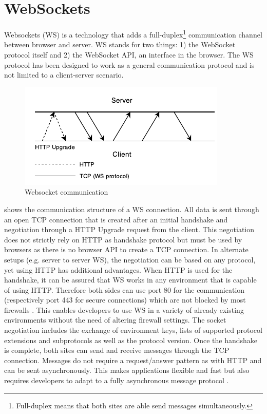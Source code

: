 \section{WebSockets}
\label{realtime-ws}

Websockets (WS) is a technology that adds a full-duplex\footnote{Full-duplex means that both sites are able send messages simultaneously.} communication channel between browser and server. WS stands for two things: 1) the WebSocket protocol itself and 2) the WebSocket API, an interface in the browser. The WS protocol has been designed to work as a general communication protocol and is not limited to a client-server scenario.

\begin{figure}[htb]
  \centerline{\includegraphics[width=0.9\linewidth]{images/Websockets.pdf}}
  \caption[Websocket communication]{Websocket communication}
  \label{fig:websockets}
\end{figure}

 shows the communication structure of a WS connection. All data is sent through an open TCP connection that is created after an initial handshake and negotiation through a HTTP Upgrade request from the client. This negotiation does not strictly rely on HTTP as handshake protocol but must be used by browsers as there is no browser API to create a TCP connection. In alternate setups (e.g. server to server WS), the negotiation can be based on any protocol, yet using HTTP has additional advantages. When HTTP is used for the handshake, it can be assured that WS works in any environment that is capable of using HTTP. Therefore both sides can use port 80 for the communication (respectively port 443 for secure connections) which are not blocked by most firewalls \cite[p. 298f]{grigorik2013high}. This enables developers to use WS in a variety of already existing environments without the need of altering firewall settings. The socket negotiation includes the exchange of environment keys, lists of supported protocol extensions and subprotocols as well as the protocol version. Once the handshake is complete, both sites can send and receive messages through the TCP connection. Messages do not require a request/answer pattern as with HTTP and can be sent asynchronously. This makes applications flexible and fast but also requires developers to adapt to a fully asynchronous message protocol \cite[chapter: Use Cases]{ubl2010websockets}.

